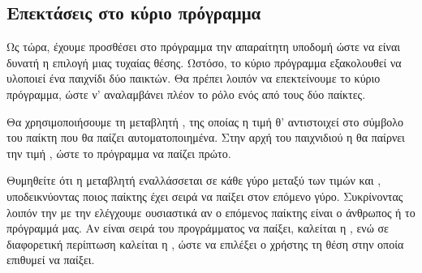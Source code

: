 \documentclass[a4paper,11pt,oneside]{book}
\begin{document}

\subsection{Επεκτάσεις στο κύριο πρόγραμμα}

Ως τώρα, έχουμε προσθέσει στο πρόγραμμα την απαραίτητη υποδομή ώστε να είναι δυνατή η επιλογή μιας τυχαίας θέσης. Ωστόσο, το κύριο πρόγραμμα εξακολουθεί να υλοποιεί ένα παιχνίδι δύο παικτών. Θα πρέπει λοιπόν να επεκτείνουμε το κύριο πρόγραμμα, ώστε ν' αναλαμβάνει πλέον το ρόλο ενός από τους δύο παίκτες. 

Θα χρησιμοποιήσουμε τη μεταβλητή , της οποίας η τιμή θ’ αντιστοιχεί στο σύμβολο του παίκτη που θα παίζει αυτοματοποιημένα. Στην αρχή του παιχνιδιού η  θα παίρνει την τιμή , ώστε το πρόγραμμα να παίζει πρώτο.


Θυμηθείτε ότι η μεταβλητή  εναλλάσσεται σε κάθε γύρο μεταξύ των τιμών  και , υποδεικνύοντας ποιος παίκτης έχει σειρά να παίξει στον επόμενο γύρο. Συκρίνοντας λοιπόν την  με την  ελέγχουμε ουσιαστικά αν ο επόμενος παίκτης είναι ο άνθρωπος ή το πρόγραμμά μας.
Αν είναι σειρά του προγράμματος να παίξει, καλείται η , ενώ σε διαφορετική περίπτωση καλείται η , ώστε να επιλέξει ο χρήστης τη θέση στην οποία επιθυμεί να παίξει.
\end{document}
